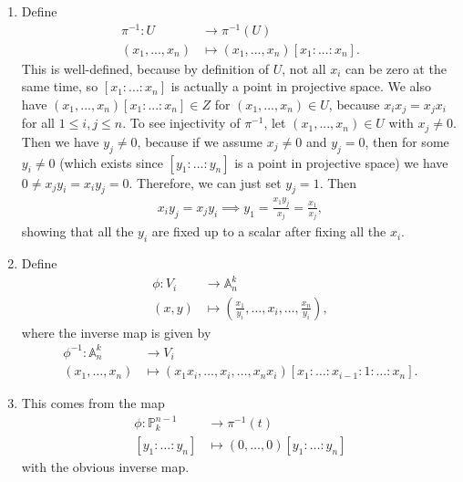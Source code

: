\newcommand{\sheet}{3}




\maketitle{}

\begin{exercise}{1}
    \begin{enumerate}
        \item Define 
        \begin{align*}
            \pi^{-1}:U &\longrightarrow \pi^{-1}(U) \\
            (x_1,...,x_n)  &\mapsto (x_1,...,x_n)[x_1:...:x_n].
        \end{align*}
        This is well-defined, because by definition of $U$, not all
        $x_i$ can be zero at the same time, so $[x_1:...:x_n]$ is actually a
        point in projective space. We also have 
            $(x_1,...,x_n)[x_1:...:x_n]\in Z$ for $(x_1,...,x_n)\in U$,
            because $x_ix_j=x_jx_i$ for all $1\leq i,j \leq n.$
            To see injectivity of $\pi^{-1}$, let
            $(x_1,...,x_n)\in U$ with $x_j\not = 0$. Then we have $y_j\not = 0$, because
            if we assume $x_j\not =0$ and $y_j=0$, then for some $y_i\not =0$ 
            (which exists since $[y_1:...:y_n]$ is a point in projective space) 
            we have $0\not = x_jy_i= x_iy_j=0.$
            Therefore, we can just set $y_j=1$. Then 
            \begin{align*}
                x_iy_j=x_jy_i \implies y_1=\frac{x_1y_j}{x_j}=\frac{x_1}{x_j},
            \end{align*}
            showing that all the $y_i$ are fixed up to a scalar after fixing all the $x_i$.
        \item    
            Define 
            \begin{align*}
                \phi: V_i &\to \mathbb{A}_n^k\\
                (x,y)&\mapsto (\frac{x_1}{y_i},\dots, x_i,\dots,\frac{x_n}{y_i}),
            \end{align*}
            where the inverse map is given by 
            \begin{align*}
                \phi^{-1}:\mathbb{A}_n^k &\to V_i\\
                (x_1,\dots,x_n)&\mapsto (x_1x_i,\dots,x_i,\dots,x_nx_i)[x_1:\dots:x_{i-1}:1:\dots:x_n].
            \end{align*}
        \item 
            This comes from the map 
            \begin{align*}
                \phi:\mathbb{P}_k^{n-1}&\to \pi^{-1}(t) \\
                [y_1:\dots :y_n]&\mapsto (0,\dots,0)[y_1:\dots:y_n]
            \end{align*}
            with the obvious inverse map.
    \end{enumerate}
\end{exercise}

